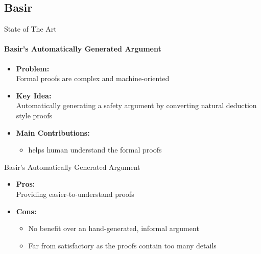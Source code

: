 \documentclass[xcolor=x11names,compress]{beamer}
\renewcommand{\(}{\begin{columns}}
\renewcommand{\)}{\end{columns}}
\newcommand{\<}[1]{\begin{column}{#1}}
\renewcommand{\>}{\end{column}}
\begin{document}
\subsection{Basir}
\begin{frame}{State of The Art}
\framesubtitle{Basir's Automatically Generated Argument \cite{Basir:safety}}
\begin{itemize}
\item \textbf{Problem:}\\Formal proofs are complex and machine-oriented
\item \textbf{Key Idea:} \\Automatically generating a safety argument by converting natural deduction style proofs
\item \textbf{Main Contributions:}
\begin{itemize}
	\item helps human understand the formal proofs
\end{itemize}
\end{itemize}

\end{frame}


\begin{frame}{Basir's Automatically Generated Argument}
\begin{itemize}
\item \textbf{Pros:} \\
	Providing easier-to-understand proofs
\item \textbf{Cons:} \\
    \begin{itemize}
	\item No benefit over an hand-generated, informal argument
    \item Far from satisfactory as the proofs contain too many details
    \end{itemize}
\end{itemize}
\end{frame}

\end{document}
